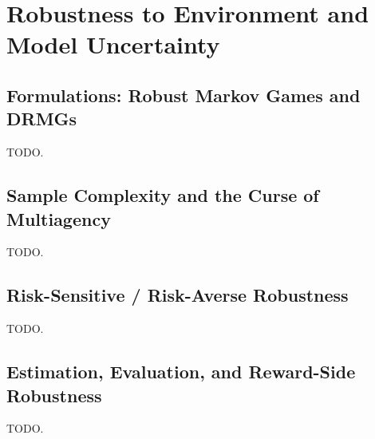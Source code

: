 \section{Robustness to Environment and Model Uncertainty}
\label{sec:model}


\subsection{Formulations: Robust Markov Games and DRMGs}
TODO.

\subsection{Sample Complexity and the Curse of Multiagency}
TODO.

\subsection{Risk-Sensitive / Risk-Averse Robustness}
TODO.

\subsection{Estimation, Evaluation, and Reward-Side Robustness}
TODO.

